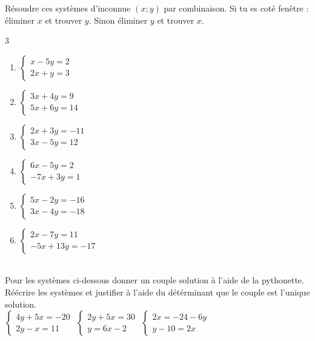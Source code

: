 \documentclass[main.tex]{subfiles}
\begin{document}
\begin{exercise} Résoudre ces systèmes d'inconnue $(x;y)$ par combinaison. Si tu es coté fenêtre : éliminer $x$ et trouver $y$. Sinon  éliminer $y$ et trouver $x$. 
\vspace{-1em}
	\begin{multicols}{3} 
		\begin{enumerate}[leftmargin =*,label={$S_\arabic*$}] 
			\item $\begin{cases}
				x -5y = 2\\2x + y = 3 
			\end{cases}$
			\item $\begin{cases}
				3x + 4y = 9 \\5x + 6y = 14 
			\end{cases}$
			\item $\begin{cases}
				2x + 3y = -11 \\3x - 5y = 12
			\end{cases}$
			\item $\begin{cases}
				6x - 5y = 2 \\-7x + 3y = 1
			\end{cases}$
			\item $\begin{cases}
				5x - 2y = -16 \\3x - 4y = -18
			\end{cases}$
			\item $\begin{cases}
				2x - 7y = 11 \\-5x + 13y = -17
			\end{cases}$
		\end{enumerate}  
	\end{multicols}
\end{exercise} 
\begin{exercise} \hfill \\ 
	Pour les systèmes ci-dessous donner un couple solution à l'aide de la pythonette. Réécrire les systèmes et justifier à l'aide du détérminant que le couple est l'unique solution.\\ 
	$\begin{cases}
		4y+5x=-20  \\ 2y-x=11
	\end{cases}$
	\hfill 
	$\begin{cases}
			2y+5x=30  \\ y=6x-2
		\end{cases}$
	\hfill 
	$\begin{cases}
			2x=-24-6y  \\ y-10=2x
		\end{cases}$
\end{exercise} 
\end{document}
